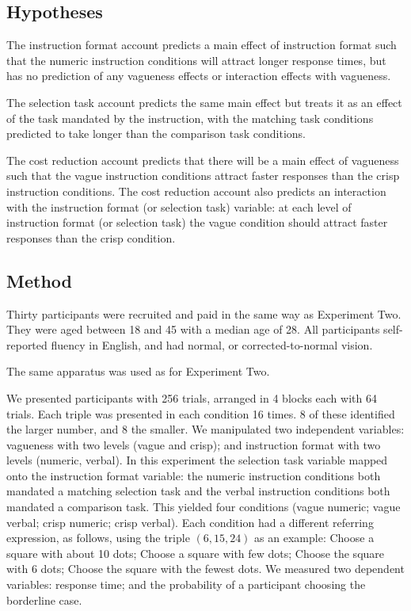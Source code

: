 \documentclass[doc,apacite]{apa6}
\begin{document}
\subsection{Hypotheses}
The instruction format account predicts a main effect of instruction format such that the numeric instruction conditions will attract longer response times, but has no prediction of any vagueness effects or interaction effects with vagueness.  

The selection task account predicts the same main effect but treats it as an effect of the task mandated by the instruction, with the matching task conditions predicted to take longer than the comparison task conditions.  

The cost reduction account predicts that there will be a main effect of vagueness such that the vague instruction conditions attract faster responses than the crisp instruction conditions. The cost reduction account also predicts an interaction with the instruction format (or selection task) variable: at each level of instruction format (or selection task) the vague condition should attract faster responses than the crisp condition.

\subsection{Method}

Thirty participants were recruited and paid in the same way as Experiment Two. They were aged between 18 and 45 with a median age of 28. All participants self-reported fluency in English, and had normal, or corrected-to-normal vision.

The same apparatus was used as for Experiment Two.

We presented participants with 256 trials, arranged in 4 blocks each with 64 trials. Each triple was presented in each condition 16 times. 8 of these identified the larger number, and 8 the smaller. We manipulated two independent variables: vagueness with two levels (vague and crisp); and instruction format with two levels (numeric, verbal). In this experiment the selection task variable mapped onto the instruction format variable: the numeric instruction conditions both mandated a matching selection task and the verbal instruction conditions both mandated a comparison task. This yielded four conditions (vague numeric; vague verbal; crisp numeric; crisp verbal). Each condition had a different referring expression, as follows, using the triple $(6,15,24)$ as an example: Choose a square with about 10 dots; Choose a square with few dots; Choose the square with 6 dots; Choose the square with the fewest dots. We measured two dependent variables: response time; and the probability of a participant choosing the borderline case.
\end{document}

